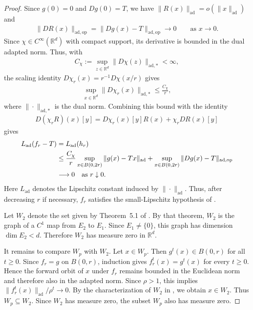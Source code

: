 \documentclass{article}
\begin{document}
\begin{proof}
Since $g(0)=0$ and $Dg(0)=T$, we have
$\|R(x)\|_{\mathrm{ad}}=o(\|x\|_{\mathrm{ad}})$ and
\begin{align}
    \|DR(x)\|_{\mathrm{ad},\mathrm{op}}
    =
    \|Dg(x)-T\|_{\mathrm{ad},\mathrm{op}}
    \longrightarrow0
    \qquad\text{as }x\to0.
\end{align}
Since $\chi\in C^\infty(\mathbb R^d)$ with compact support, its derivative is bounded in the
dual adapted norm. Thus, with
\begin{align}
    C_\chi
    :=
    \sup_{z\in\mathbb R^d}\|D\chi(z)\|_{\mathrm{ad},*}
    <\infty,
\end{align}
the scaling identity $D\chi_r(x)=r^{-1}D\chi(x/r)$ gives
\begin{align}
    \sup_{x\in\mathbb R^d}
    \|D\chi_r(x)\|_{\mathrm{ad},*}
    \le
    \frac{C_\chi}{r},
\end{align}
where $\|\cdot\|_{\mathrm{ad},*}$ is the dual norm. Combining this bound with
the identity
\begin{align}
    D(\chi_rR) (x)[y]= D\chi_r(x)[y]R(x)  + \chi_rDR(x)[y]
\end{align}
gives
\begin{align}
    L_{\mathrm{ad}}(f_r-T)
    &=L_{\mathrm{ad}}(h_r) \notag\\
    &\le
    \frac{C_\chi}{r}
        \sup_{x \in B(0,2r)}\|g(x)-Tx\|_{\mathrm{ad}}
    +\sup_{x \in B(0,2r)}\|Dg(x)-T\|_{\mathrm{ad},\mathrm{op}}
    \notag\\
    &\longrightarrow 0
    \quad\text{as }r\downarrow0.
\end{align}
Here $L_{\mathrm{ad}}$ denotes the Lipschitz constant induced by
$\|\cdot\|_{\mathrm{ad}}$.
Thus, after decreasing $r$ if necessary, $f_r$ satisfies the small-Lipschitz
hypothesis of \citet[Theorem~5.1]{hirsch1977invariant}.

Let $W_2$ denote the set given by Theorem~5.1 of
\citet{hirsch1977invariant}. By that theorem, $W_2$ is the graph of a $C^1$
map from $E_2$ to $E_1$. Since $E_1\neq\{0\}$, this graph has dimension
$\dim E_2<d$. Therefore $W_2$ has measure zero in $\mathbb R^d$.

It remains to compare $W_p$ with $W_2$. Let $x\in W_p$. Then
$g^t(x)\in B(0,r)$ for all $t\ge 0$. Since $f_r=g$ on $B(0,r)$, induction gives
$f_r^t(x)=g^t(x)$ for every $t\ge 0$. Hence the forward orbit of $x$ under
$f_r$ remains bounded in the Euclidean norm and therefore also in the adapted
norm. Since $\rho>1$, this implies
$\|f_r^t(x)\|_{\mathrm{ad}}/\rho^t\to 0$. By the characterization of $W_2$ in
\citet[Theorem~5.1]{hirsch1977invariant}, we obtain $x\in W_2$. Thus
$W_p\subseteq W_2$.
Since $W_2$ has measure zero, the subset $W_p$ also has measure zero.
\end{proof}
\end{document}

